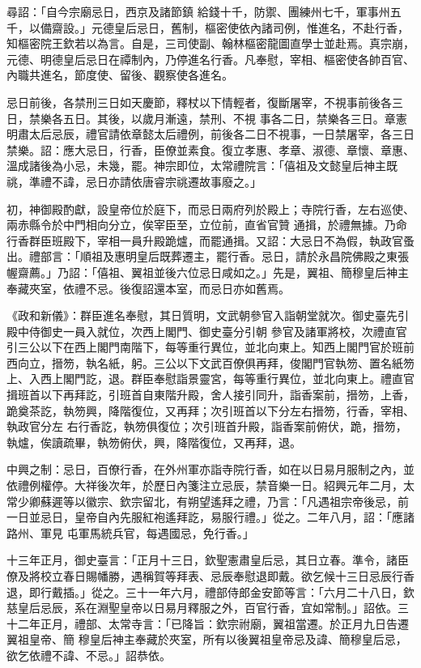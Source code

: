 \begin{pinyinscope}
 尋詔：「自今宗廟忌日，西京及諸節鎮
 給錢十千，防禦、團練州七千，軍事州五千，以備齋設。」元德皇后忌日，舊制，樞密使依內諸司例，惟進名，不赴行香，知樞密院王欽若以為言。自是，三司使副、翰林樞密龍圖直學士並赴焉。真宗崩，元德、明德皇后忌日在禫制內，乃停進名行香。凡奉慰，宰相、樞密使各帥百官、內職共進名，節度使、留後、觀察使各進名。



 忌日前後，各禁刑三日如天慶節，釋杖以下情輕者，復斷屠宰，不視事前後各三日，禁樂各五日。其後，以歲月漸遠，禁刑、不視
 事各二日，禁樂各三日。章憲明肅太后忌辰，禮官請依章懿太后禮例，前後各二日不視事，一日禁屠宰，各三日禁樂。詔：應大忌日，行香，臣僚並素食。復立孝惠、孝章、淑德、章懷、章惠、溫成諸後為小忌，未幾，罷。神宗即位，太常禮院言：「僖祖及文懿皇后神主既祧，準禮不諱，忌日亦請依唐睿宗祧遷故事廢之。」



 初，神御殿酌獻，設皇帝位於庭下，而忌日兩府列於殿上；寺院行香，左右巡使、兩赤縣令於中門相向分立，俟宰臣至，立位前，直省官贊
 通揖，於禮無據。乃命行香群臣班殿下，宰相一員升殿跪爐，而罷通揖。又詔：大忌日不為假，執政官蚤出。禮部言：「順祖及惠明皇后既葬遷主，罷行香。忌日，請於永昌院佛殿之東張幄齋薦。」乃詔：「僖祖、翼祖並後六位忌日咸如之。」先是，翼祖、簡穆皇后神主奉藏夾室，依禮不忌。後復詔還本室，而忌日亦如舊焉。



 《政和新儀》：群臣進名奉慰，其日質明，文武朝參官入詣朝堂就次。御史臺先引殿中侍御史一員入就位，次西上閣門、御史臺分引朝
 參官及諸軍將校，次禮直官引三公以下在西上閣門南階下，每等重行異位，並北向東上。知西上閣門官於班前西向立，搢笏，執名紙，躬。三公以下文武百僚俱再拜，俊閣門官執笏、置名紙笏上、入西上閣門訖，退。群臣奉慰詣景靈宮，每等重行異位，並北向東上。禮直官揖班首以下再拜訖，引班首自東階升殿，舍人接引同升，詣香案前，搢笏，上香，跪奠茶訖，執笏興，降階復位，又再拜；次引班首以下分左右搢笏，行香，宰相、執政官分左
 右行香訖，執笏俱復位；次引班首升殿，詣香案前俯伏，跪，搢笏，執爐，俟讀疏畢，執笏俯伏，興，降階復位，又再拜，退。



 中興之制：忌日，百僚行香，在外州軍亦詣寺院行香，如在以日易月服制之內，並依禮例權停。大祥後次年，於歷日內箋注立忌辰，禁音樂一日。紹興元年二月，太常少卿蘇遲等以徽宗、欽宗留北，有朔望遙拜之禮，乃言：「凡遇祖宗帝後忌，前一日並忌日，皇帝自內先服紅袍遙拜訖，易服行禮。」從之。二年八月，詔：「應諸路州、軍見
 屯軍馬統兵官，每遇國忌，免行香。」



 十三年正月，御史臺言：「正月十三日，欽聖憲肅皇后忌，其日立春。準令，諸臣僚及將校立春日賜幡勝，遇稱賀等拜表、忌辰奉慰退即戴。欲乞候十三日忌辰行香退，即行戴插。」從之。三十一年六月，禮部侍郎金安節等言：「六月二十八日，欽慈皇后忌辰，系在淵聖皇帝以日易月釋服之外，百官行香，宜如常制。」詔依。三十二年正月，禮部、太常寺言：「已降旨：欽宗祔廟，翼祖當遷。於正月九日告遷翼祖皇帝、簡
 穆皇后神主奉藏於夾室，所有以後翼祖皇帝忌及諱、簡穆皇后忌，欲乞依禮不諱、不忌。」詔恭依。




\end{pinyinscope}
